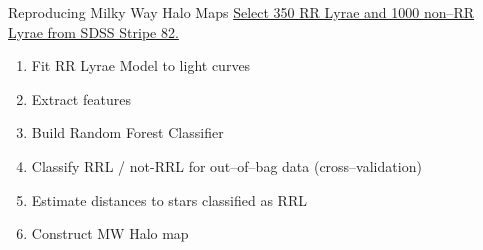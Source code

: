 \documentclass[12pt]{beamer}
\begin{document}
  

  







\begin{frame}{Reproducing Milky Way Halo Maps}
\underline{Select 350 RR Lyrae and 1000 non--RR Lyrae from SDSS Stripe 82.}
\begin{enumerate}
  \item Fit RR Lyrae Model to light curves
  \item Extract features
  \item Build Random Forest Classifier
  \item Classify RRL / not-RRL for out--of--bag data (cross--validation)
  \item Estimate distances to stars classified as RRL
  \item Construct MW Halo map
\end{enumerate}
\end{frame}
\end{document}
